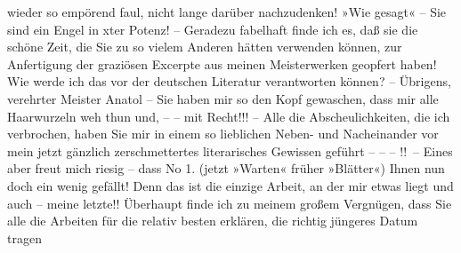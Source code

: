                wieder so empörend faul, nicht lange darüber nachzudenken! »Wie gesagt« – Sie sind
               ein Engel in xter Potenz! – Geradezu fabelhaft finde ich es, daß sie die {\pb}schöne Zeit, die Sie zu so vielem Anderen hätten
               verwenden können, zur Anfertigung der graziösen Excerpte aus meinen Meisterwerken geopfert haben!
               Wie werde ich das \introOben{}vor\introOben{} der deutschen Literatur verantworten können? – Übrigens, verehrter Meister Anatol – Sie haben mir so den
               Kopf gewaschen, dass mir alle Haarwurzeln weh thun und, – – mit Recht!!! – Alle die
               Abscheulichkeiten, die ich verbrochen, haben Sie mir in einem so lieblichen Neben-
               und Nacheinander vor mein jetzt gänzlich zerschmettertes literarisches Gewissen
               geführt – – – \label{K_L03703-3v}\label{K_L03703-3}!! –
               Eines aber freut mich riesig – dass No 1. (jetzt »Warten« früher »Blätter«) Ihnen nun doch ein wenig gefällt! Denn
               das ist die einzige Arbeit, an der mir etwas liegt und auch – meine letzte!!
               Überhaupt finde {\pb}ich zu meinem großem Vergnügen, dass Sie
               alle die Arbeiten für die relativ besten erklären, die richtig jüngeres Datum tragen
